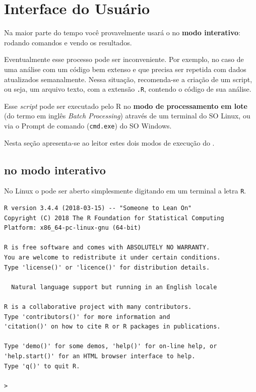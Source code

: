 \documentclass[]{book}
\newenvironment{Shaded}{\begin{snugshade}}{\end{snugshade}}
\newcommand{\ExtensionTok}[1]{#1}
\newcommand{\NormalTok}[1]{#1}
\begin{document}
\chapter{Interface do Usuário}\label{iu}

Na maior parte do tempo você provavelmente usará o no \textbf{modo
interativo}: rodando comandos e vendo os resultados.

Eventualmente esse processo pode ser inconveniente. Por exemplo, no caso
de uma análise com um código bem extenso e que precisa ser repetida com
dados atualizados semanalmente. Nessa situação, recomenda-se a criação
de um script, ou seja, um arquivo texto, com a extensão \texttt{.R},
contendo o código de sua análise.

Esse \emph{script} pode ser executado pelo R no \textbf{modo de
processamento em lote} (do termo em inglês \emph{Batch Processing})
através de um terminal do SO Linux, ou via o Prompt de comando
(\texttt{cmd.exe}) do SO Windows.

Nesta seção apresenta-se ao leitor estes dois modos de execução do .

\section{ no modo interativo}\label{no-modo-interativo}

No Linux o pode ser aberto simplesmente digitando em um terminal a letra
\texttt{R}.

\begin{Shaded}
\end{Shaded}

\begin{verbatim}
R version 3.4.4 (2018-03-15) -- "Someone to Lean On"
Copyright (C) 2018 The R Foundation for Statistical Computing
Platform: x86_64-pc-linux-gnu (64-bit)

R is free software and comes with ABSOLUTELY NO WARRANTY.
You are welcome to redistribute it under certain conditions.
Type 'license()' or 'licence()' for distribution details.

  Natural language support but running in an English locale

R is a collaborative project with many contributors.
Type 'contributors()' for more information and
'citation()' on how to cite R or R packages in publications.

Type 'demo()' for some demos, 'help()' for on-line help, or
'help.start()' for an HTML browser interface to help.
Type 'q()' to quit R.

> 
\end{verbatim}
\end{document}
